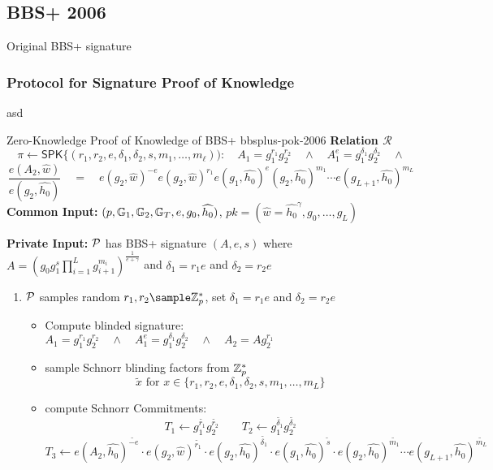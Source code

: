 {%
% 
% 

\newpage
\subsection{BBS+ 2006}
Original BBS+ signature
\subsubsection{Protocol for Signature Proof of Knowledge}
asd

\begin{protocol}{\cite{hutchison_constant-size_2006} Zero-Knowledge Proof of Knowledge of BBS+ }{bbsplus-pok-2006}
    \textbf{Relation $\mathcal{R}$}
        \[
        \pi \gets \mathsf{SPK}\{(r_1, r_2, e, \delta_1, \delta_2, s, m_1,\ldots,m_{\ell})): \quad A_1 = g_1^{r_1}g_2^{r_2} \quad \wedge \quad A_1^e = g_1^{\delta_1}g_2^{\delta_2} \quad \wedge 
        \]
        \[
        \frac{e(A_2, \widehat{w})}{e(g_2, \widehat{h_0})} \quad = \quad 
        e(g_2,\widehat{w})^{-e}e(g_2,\widehat{w})^{r_1}e(g_1,\widehat{h_0})^e(g_2,\widehat{h_0})^{m_1}\cdots e(g_{L+1},\widehat{h_0})^{m_L}
        \]
    \textbf{Common Input:} $(p, \mathbb{G}_1, \mathbb{G}_2, \mathbb{G}_T, e, g_0, \widehat{h_0})$, $pk = (\hat{w} = \hat{h_0}^{\gamma},  g_0, \ldots, g_{L})$

    \textbf{Private Input:} $\mathcal{P}$ has BBS+ signature $(A,e,s)$ where $A = (g_0g_1^s\prod_{i=1}^{L} g_{i+1}^{m_i})^{\frac{1}{e+\gamma}}$ and $\delta_1 = r_1e$ and $\delta_2 = r_2e$

    \vspace{1em}
    \begin{enumerate}
        \item $\mathcal{P}$ samples random $r_1, r_2 \sample \Z_p^*$, set $\delta_1 = r_1e$ and $\delta_2 = r_2e$
         \begin{itemize}
        \item Compute blinded signature: $A_1 = g_1^{r_1}g_2^{r_2} \quad \wedge \quad A_1^e = g_1^{\delta_1}g_2^{\delta_2} \quad \wedge \quad A_2 = Ag_2^{r_1}$

        \item sample Schnorr blinding factors from $\mathbb{Z}_p^*$
         \[
         \tilde{x} \text{ for } x \in \{r_1, r_2, e, \delta_1, \delta_2, s, m_1,\ldots,m_{L}\}
         \]

        \item compute Schnorr Commitments:
        \[
        T_1 \gets g_1^{\tilde{r_1}}g_2^{\tilde{r_2}} \qquad T_2 \gets g_1^{\tilde{\delta_1}} g_2^{\tilde{\delta_2}} 
        \]
        \[
        T_3 \gets e(A_2, \hat{h_0})^{\tilde{-e}}\cdot e(g_2, \hat{w})^{\tilde{r_1}} \cdot e(g_2, \hat{h_0})^{\tilde{\delta_1}} \cdot e(g_1, \hat{h_0})^{\tilde{s}} \cdot e(g_2, \hat{h_0})^{\tilde{m_1}} \cdots e(g_{L+1}, \hat{h_0})^{\tilde{m_L}}
        \]
        

\end{itemize}
\end{enumerate}
\end{protocol}}
